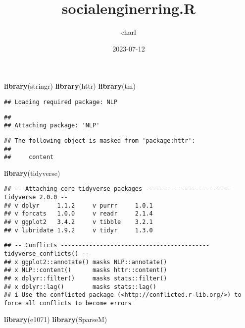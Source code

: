 \documentclass[
]{article}
\title{socialenginerring.R}
\author{charl}
\date{2023-07-12}
\newenvironment{Shaded}{\begin{snugshade}}{\end{snugshade}}
\newcommand{\FunctionTok}[1]{\textcolor[rgb]{0.13,0.29,0.53}{\textbf{#1}}}
\newcommand{\NormalTok}[1]{#1}
\begin{document}
\maketitle

\begin{Shaded}
\begin{Highlighting}[]
\FunctionTok{library}\NormalTok{(stringr)}
\FunctionTok{library}\NormalTok{(httr)}
\FunctionTok{library}\NormalTok{(tm)}
\end{Highlighting}
\end{Shaded}

\begin{verbatim}
## Loading required package: NLP
\end{verbatim}

\begin{verbatim}
## 
## Attaching package: 'NLP'
\end{verbatim}

\begin{verbatim}
## The following object is masked from 'package:httr':
## 
##     content
\end{verbatim}

\begin{Shaded}
\begin{Highlighting}[]
\FunctionTok{library}\NormalTok{(tidyverse)}
\end{Highlighting}
\end{Shaded}

\begin{verbatim}
## -- Attaching core tidyverse packages ------------------------ tidyverse 2.0.0 --
## v dplyr     1.1.2     v purrr     1.0.1
## v forcats   1.0.0     v readr     2.1.4
## v ggplot2   3.4.2     v tibble    3.2.1
## v lubridate 1.9.2     v tidyr     1.3.0
\end{verbatim}

\begin{verbatim}
## -- Conflicts ------------------------------------------ tidyverse_conflicts() --
## x ggplot2::annotate() masks NLP::annotate()
## x NLP::content()      masks httr::content()
## x dplyr::filter()     masks stats::filter()
## x dplyr::lag()        masks stats::lag()
## i Use the conflicted package (<http://conflicted.r-lib.org/>) to force all conflicts to become errors
\end{verbatim}

\begin{Shaded}
\begin{Highlighting}[]
\FunctionTok{library}\NormalTok{(e1071)}
\FunctionTok{library}\NormalTok{(SparseM)}
\end{Highlighting}
\end{Shaded}
\end{document}
